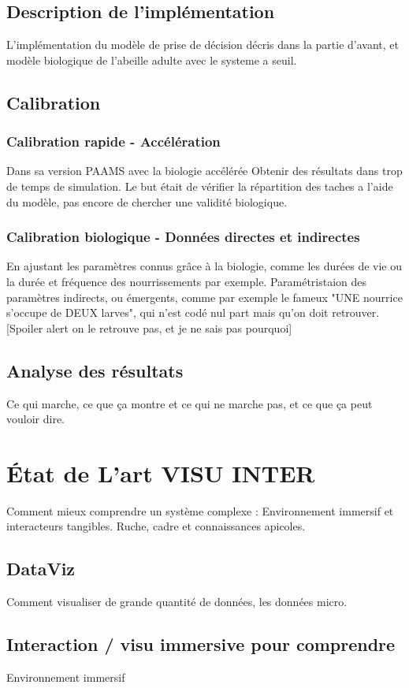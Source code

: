 \documentclass[10pt,a4paper]{article}
\begin{document}
	\subsection{Description de l'implémentation}
		L'implémentation du modèle de prise de décision décris dans la partie d'avant, et modèle biologique de l'abeille adulte avec le systeme a seuil.
	\subsection{Calibration}
		\subsubsection{Calibration rapide - Accélération}
			Dans sa version PAAMS avec la biologie accélérée
			Obtenir des résultats dans trop de temps de simulation. Le but était de vérifier la répartition des taches a l'aide du modèle, pas encore de chercher une validité biologique.
		\subsubsection{Calibration biologique - Données directes et indirectes}
			En ajustant les paramètres connus grâce à la biologie, comme les durées de vie ou la durée et fréquence des nourrissements par exemple.
			Paramétristaion des paramètres indirects, ou émergents, comme par exemple le fameux "UNE nourrice s'occupe de DEUX larves", qui n'est codé nul part mais qu'on doit retrouver. [Spoiler alert on le retrouve pas, et je ne sais pas pourquoi]
	\subsection{Analyse des résultats}
		Ce qui marche, ce que ça montre et ce qui ne marche pas, et ce que ça peut vouloir dire.
		
			
\section{État de L'art VISU INTER}
	Comment mieux comprendre un système complexe : Environnement immersif et interacteurs tangibles. Ruche, cadre et connaissances apicoles.
	\subsection{DataViz}
		Comment visualiser de grande quantité de données, les données micro.
	\subsection{Interaction / visu immersive pour comprendre}
		Environnement immersif
\end{document}
